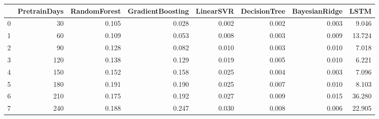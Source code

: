 \begin{tabular}{lrrrrrrr}
\toprule
{} &  PretrainDays &  RandomForest &  GradientBoosting &  LinearSVR &  DecisionTree &  BayesianRidge &   LSTM \\
\midrule
0 &            30 &         0.105 &             0.028 &      0.002 &         0.002 &          0.003 &  9.046 \\
1 &            60 &         0.109 &             0.053 &      0.008 &         0.003 &          0.009 & 13.724 \\
2 &            90 &         0.128 &             0.082 &      0.010 &         0.003 &          0.010 &  7.018 \\
3 &           120 &         0.138 &             0.129 &      0.019 &         0.005 &          0.010 &  6.221 \\
4 &           150 &         0.152 &             0.158 &      0.025 &         0.004 &          0.003 &  7.096 \\
5 &           180 &         0.191 &             0.190 &      0.025 &         0.007 &          0.010 &  8.103 \\
6 &           210 &         0.175 &             0.192 &      0.027 &         0.009 &          0.015 & 36.280 \\
7 &           240 &         0.188 &             0.247 &      0.030 &         0.008 &          0.006 & 22.905 \\
\bottomrule
\end{tabular}

